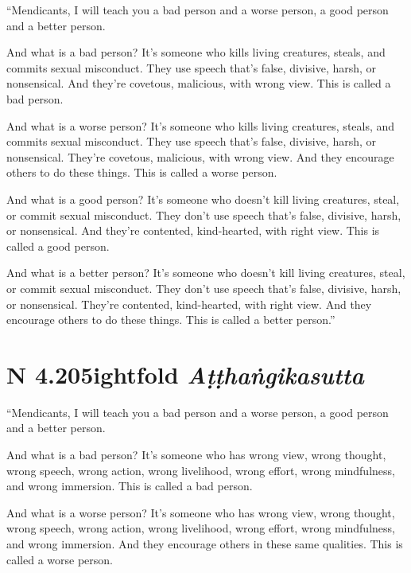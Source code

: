 \documentclass[12pt,openany]{book}%
\newcommand*{\suttatitleacronym}[1]{\smaller[2]{#1}\vspace*{.3em}}
\newcommand*{\suttatitletranslation}[1]{\linebreak{#1}}
\newcommand*{\suttatitleroot}[1]{\linebreak\smaller[2]\itshape{#1}}
\newcommand*{\tocacronym}[1]{\hspace*{-3.3em}{#1}\quad}
\newcommand*{\toctranslation}[1]{#1}
\newcommand*{\tocroot}[1]{(\textit{#1})}
\begin{document}
“Mendicants, I will teach you a bad person and a worse person, a good person and a better person. 

And what is a bad person? It’s someone who kills living creatures, steals, and commits sexual misconduct. They use speech that’s false, divisive, harsh, or nonsensical. And they’re covetous, malicious, with wrong view. This is called a bad person. 

And what is a worse person? It’s someone who kills living creatures, steals, and commits sexual misconduct. They use speech that’s false, divisive, harsh, or nonsensical. They’re covetous, malicious, with wrong view. And they encourage others to do these things. This is called a worse person. 

And what is a good person? It’s someone who doesn’t kill living creatures, steal, or commit sexual misconduct. They don’t use speech that’s false, divisive, harsh, or nonsensical. And they’re contented, kind-hearted, with right view. This is called a good person. 

And what is a better person? It’s someone who doesn’t kill living creatures, steal, or commit sexual misconduct. They don’t use speech that’s false, divisive, harsh, or nonsensical. They’re contented, kind-hearted, with right view. And they encourage others to do these things. This is called a better person.” 

%
\section*{{\suttatitleacronym AN 4.205}{\suttatitletranslation Eightfold }{\suttatitleroot Aṭṭhaṅgikasutta}}
\addcontentsline{toc}{section}{\tocacronym{AN 4.205} \toctranslation{Eightfold } \tocroot{Aṭṭhaṅgikasutta}}

“Mendicants, I will teach you a bad person and a worse person, a good person and a better person. 

And what is a bad person? It’s someone who has wrong view, wrong thought, wrong speech, wrong action, wrong livelihood, wrong effort, wrong mindfulness, and wrong immersion. This is called a bad person. 

And what is a worse person? It’s someone who has wrong view, wrong thought, wrong speech, wrong action, wrong livelihood, wrong effort, wrong mindfulness, and wrong immersion. And they encourage others in these same qualities. This is called a worse person. 
\end{document}
